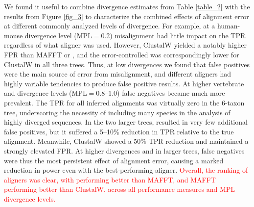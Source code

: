 \documentclass{article}
\begin{document}
We found it useful to combine divergence estimates from Table
\ref{table_2} with the results from Figure \ref{fig_3} to characterize
the combined effects of alignment error at different commonly analyzed
levels of divergence. For example, at a human-mouse divergence level
(MPL$=$0.2) misalignment had little impact on the TPR regardless of
what aligner was used. However, ClustalW yielded a notably higher FPR
than MAFFT or \prankc, and the error-controlled \tpr{} was
correspondingly lower for ClustalW in all three trees. Thus, at low
divergences we found that false positives were the main source of
error from misalignment, and different aligners had highly variable
tendencies to produce false positive results. At higher vertebrate and
\Dr divergence levels (MPL$=$0.8--1.0) false negatives became much
more prevalent. The TPR for all inferred alignments was virtually zero
in the 6-taxon tree, underscoring the necessity of including many
species in the analysis of highly diverged sequences. In the two
larger trees, \prankc resulted in very few additional false positives,
but it suffered a 5--10\% reduction in TPR relative to the true
alignment. Meanwhile, ClustalW showed a 50\% TPR reduction and
maintained a strongly elevated FPR. At higher divergences and in
larger trees, false negatives were thus the most persistent effect of
alignment error, causing a marked reduction in \sw power even with the
best-performing aligner. \textcolor{red}{Overall, the ranking of
  aligners was clear, with \prankc performing better than MAFFT, and
  MAFFT performing better than ClustalW, across all performance
  measures and MPL divergence levels.}
\end{document}
